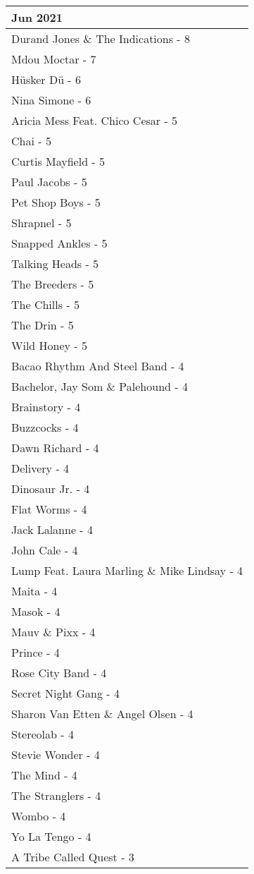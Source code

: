 \documentclass[
]{article}
\begin{document}
\begin{longtable}{l}
\midrule
\multicolumn{1}{l}{Jun 2021} \\ 
\midrule
Durand Jones \& The Indications - 8 \\ 
Mdou Moctar - 7 \\ 
Hüsker Dü - 6 \\ 
Nina Simone - 6 \\ 
Aricia Mess Feat. Chico Cesar - 5 \\ 
Chai - 5 \\ 
Curtis Mayfield - 5 \\ 
Paul Jacobs - 5 \\ 
Pet Shop Boys - 5 \\ 
Shrapnel - 5 \\ 
Snapped Ankles - 5 \\ 
Talking Heads - 5 \\ 
The Breeders - 5 \\ 
The Chills - 5 \\ 
The Drin - 5 \\ 
Wild Honey - 5 \\ 
Bacao Rhythm And Steel Band - 4 \\ 
Bachelor, Jay Som \& Palehound - 4 \\ 
Brainstory - 4 \\ 
Buzzcocks - 4 \\ 
Dawn Richard - 4 \\ 
Delivery - 4 \\ 
Dinosaur Jr. - 4 \\ 
Flat Worms - 4 \\ 
Jack Lalanne - 4 \\ 
John Cale - 4 \\ 
Lump Feat. Laura Marling \& Mike Lindsay - 4 \\ 
Maita - 4 \\ 
Masok - 4 \\ 
Mauv \& Pixx - 4 \\ 
Prince - 4 \\ 
Rose City Band - 4 \\ 
Secret Night Gang - 4 \\ 
Sharon Van Etten \& Angel Olsen - 4 \\ 
Stereolab - 4 \\ 
Stevie Wonder - 4 \\ 
The Mind - 4 \\ 
The Stranglers - 4 \\ 
Wombo - 4 \\ 
Yo La Tengo - 4 \\ 
A Tribe Called Quest - 3 \\ 

\end{longtable}
\end{document}
